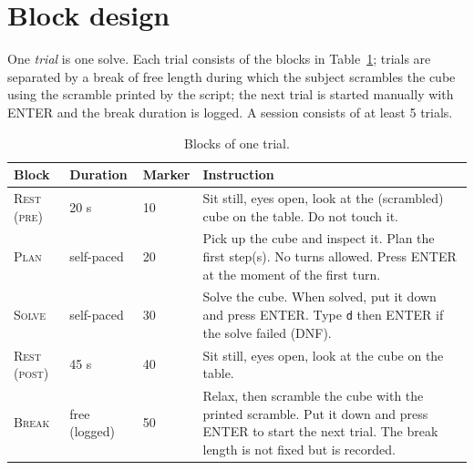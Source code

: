 \documentclass[11pt,a4paper]{article}
\begin{document}
\section{Block design}
One \emph{trial} is one solve. Each trial consists of the blocks in
Table~\ref{tab:blocks}; trials are separated by a break of free length during which the subject
scrambles the cube using the scramble printed by the script; the next trial is
started manually with ENTER and the break duration is logged. A session consists
of at least 5 trials.

\begin{table}[h]
\centering
\caption{Blocks of one trial.}
\label{tab:blocks}
\begin{tabular}{l l l p{7cm}}
\toprule
Block & Duration & Marker & Instruction \\
\midrule
\textsc{Rest (pre)}  & 20 s & 10 & Sit still, eyes open, look at the (scrambled) cube on the table. Do not touch it. \\
\textsc{Plan}        & self-paced & 20 & Pick up the cube and inspect it. Plan the first step(s). No turns allowed. Press ENTER at the moment of the first turn. \\
\textsc{Solve}       & self-paced & 30 & Solve the cube. When solved, put it down and press ENTER. Type \texttt{d} then ENTER if the solve failed (DNF). \\
\textsc{Rest (post)} & 45 s & 40 & Sit still, eyes open, look at the cube on the table. \\
\textsc{Break}       & free (logged) & 50 & Relax, then scramble the cube with the printed scramble. Put it down and press ENTER to start the next trial. The break length is not fixed but is recorded. \\
\bottomrule
\end{tabular}
\end{table}

\begin{center}
\end{center}
\end{document}
